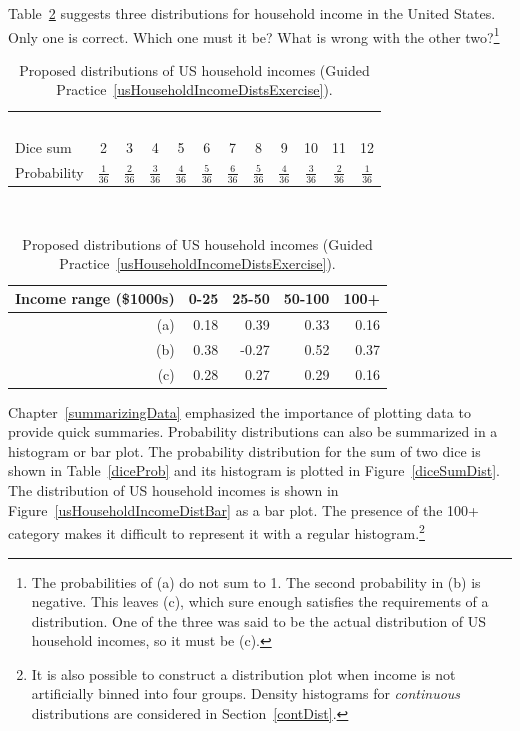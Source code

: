 \begin{exercise}\label{usHouseholdIncomeDistsExercise}
Table~\ref{usHouseholdIncomeDists} suggests three distributions for household income in the United States. Only one is correct. Which one must it be? What is wrong with the other two?\footnote{The probabilities of (a) do not sum to 1. The second probability in (b) is negative. This leaves (c), which sure enough satisfies the requirements of a distribution. One of the three was said to be the actual distribution of US household incomes, so it must be (c).}
\end{exercise}

\begin{table}
\centering
\begin{tabular}{l ccc ccc ccc cc}
  \hline
  \ \vspace{-3mm} \\
Dice sum\vspace{0.3mm} & 2 & 3 & 4 & 5 & 6 & 7 & 8 & 9 & 10 & 11 & 12  \\
Probability & $\frac{1}{36}$ & $\frac{2}{36}$ & $\frac{3}{36}$ & $\frac{4}{36}$ & $\frac{5}{36}$ & $\frac{6}{36}$ & $\frac{5}{36}$ & $\frac{4}{36}$ & $\frac{3}{36}$ & $\frac{2}{36}$ & $\frac{1}{36}$\vspace{1mm} \\
   \hline
\end{tabular}
\caption{Probability distribution for the sum of two dice.}
\label{diceProb}
\ \\[5mm]
\begin{tabular}{r | rr rr}
  \hline
Income range (\$1000s) & 0-25    & 25-50    & 50-100     & 100+    \\
  \hline
(a)\hspace{0.2mm}	 & 0.18 & 0.39 & 0.33 & 0.16 \\
(b)				 & 0.38 & -0.27 & 0.52 & 0.37 \\
(c)\hspace{0.2mm}	 & 0.28 & 0.27 & 0.29 & 0.16 \\
  \hline
\end{tabular}
\caption{Proposed distributions of US household incomes (Guided Practice~\ref{usHouseholdIncomeDistsExercise}).}
\label{usHouseholdIncomeDists}
\end{table}

Chapter~\ref{summarizingData} emphasized the importance of plotting data to provide quick summaries. Probability distributions can also be summarized in a histogram or bar plot. The probability distribution for the sum of two dice is shown in Table~\ref{diceProb} and its histogram is plotted in Figure~\ref{diceSumDist}. The distribution of US household incomes is shown in Figure~\ref{usHouseholdIncomeDistBar} as a bar plot. The presence of the 100+ category makes it difficult to represent it with a regular histogram.\footnote{It is also possible to construct a distribution plot when income is not artificially binned into four groups. Density histograms for \emph{continuous} distributions are considered in Section~\ref{contDist}.}

